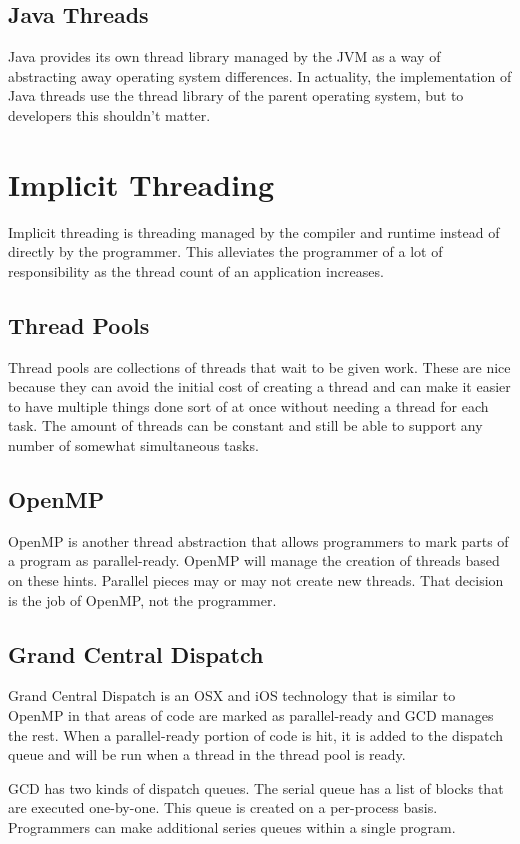 \documentclass{article}
\begin{document}
\subsection{Java Threads}
Java provides its own thread library managed by the JVM as a way of abstracting
away operating system differences. In actuality, the implementation of Java
threads use the thread library of the parent operating system, but to
developers this shouldn't matter.

\section{Implicit Threading}
Implicit threading is threading managed by the compiler and runtime instead of
directly by the programmer. This alleviates the programmer of a lot of
responsibility as the thread count of an application increases.

\subsection{Thread Pools}
Thread pools are collections of threads that wait to be given work. These are
nice because they can avoid the initial cost of creating a thread and can make
it easier to have multiple things done sort of at once without needing a thread
for each task. The amount of threads can be constant and still be able to
support any number of somewhat simultaneous tasks.

\subsection{OpenMP}
OpenMP is another thread abstraction that allows programmers to mark parts of a
program as parallel-ready. OpenMP will manage the creation of threads based on
these hints. Parallel pieces may or may not create new threads. That decision is
the job of OpenMP, not the programmer.

\subsection{Grand Central Dispatch}
Grand Central Dispatch is an OSX and iOS technology that is similar to OpenMP
in that areas of code are marked as parallel-ready and GCD manages the rest.
When a parallel-ready portion of code is hit, it is added to the dispatch queue
and will be run when a thread in the thread pool is ready.

GCD has two kinds of dispatch queues. The serial queue has a list of blocks
that are executed one-by-one. This queue is created on a per-process basis.
Programmers can make additional series queues within a single program.
\end{document}
